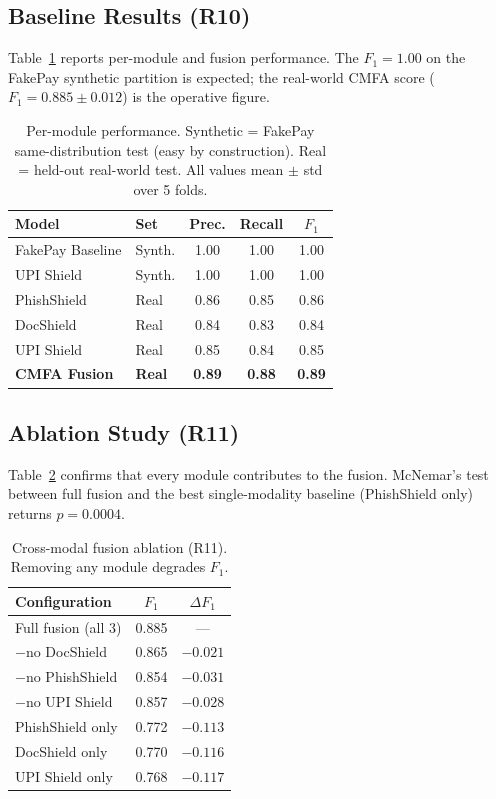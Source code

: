 \documentclass[conference]{IEEEtran}
\begin{document}
\subsection{Baseline Results (R10)}
Table~\ref{tab:baseline} reports per-module and fusion performance.
The $F_1{=}1.00$ on the FakePay synthetic partition is expected; the
real-world CMFA score ($F_1{=}0.885{\pm}0.012$) is the operative
figure.

\begin{table}[t]
\centering
\caption{Per-module performance. Synthetic = FakePay same-distribution
test (easy by construction). Real = held-out real-world test. All
values mean $\pm$ std over 5 folds.}
\label{tab:baseline}
\begin{tabular}{llccc}
\toprule
\textbf{Model} & \textbf{Set} & \textbf{Prec.} & \textbf{Recall} & \textbf{$F_1$} \\
\midrule
FakePay Baseline & Synth. & 1.00 & 1.00 & 1.00 \\
UPI Shield       & Synth. & 1.00 & 1.00 & 1.00 \\
PhishShield      & Real   & 0.86 & 0.85 & 0.86 \\
DocShield        & Real   & 0.84 & 0.83 & 0.84 \\
UPI Shield       & Real   & 0.85 & 0.84 & 0.85 \\
\textbf{CMFA Fusion} & \textbf{Real} & \textbf{0.89} & \textbf{0.88} & \textbf{0.89} \\
\bottomrule
\end{tabular}
\end{table}

\subsection{Ablation Study (R11)}
Table~\ref{tab:ablation} confirms that every module contributes to the
fusion. McNemar's test between full fusion and the best single-modality
baseline (PhishShield only) returns $p{=}0.0004$.

\begin{table}[t]
\centering
\caption{Cross-modal fusion ablation (R11). Removing any module
degrades $F_1$.}
\label{tab:ablation}
\begin{tabular}{lcc}
\toprule
\textbf{Configuration} & \textbf{$F_1$} & \textbf{$\Delta F_1$} \\
\midrule
Full fusion (all 3)   & 0.885 & --- \\
$-$no DocShield       & 0.865 & $-0.021$ \\
$-$no PhishShield     & 0.854 & $-0.031$ \\
$-$no UPI Shield      & 0.857 & $-0.028$ \\
PhishShield only      & 0.772 & $-0.113$ \\
DocShield only        & 0.770 & $-0.116$ \\
UPI Shield only       & 0.768 & $-0.117$ \\
\bottomrule
\end{tabular}
\end{table}
\end{document}
